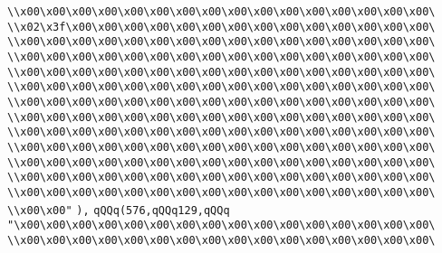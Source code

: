 \verb|\\x00\x00\x00\x00\x00\x00\x00\x00\x00\x00\x00\x00\x00\x00\x00\x00\|\newline
\verb|\\x02\x3f\x00\x00\x00\x00\x00\x00\x00\x00\x00\x00\x00\x00\x00\x00\|\newline
\verb|\\x00\x00\x00\x00\x00\x00\x00\x00\x00\x00\x00\x00\x00\x00\x00\x00\|\newline
\verb|\\x00\x00\x00\x00\x00\x00\x00\x00\x00\x00\x00\x00\x00\x00\x00\x00\|\newline
\verb|\\x00\x00\x00\x00\x00\x00\x00\x00\x00\x00\x00\x00\x00\x00\x00\x00\|\newline
\verb|\\x00\x00\x00\x00\x00\x00\x00\x00\x00\x00\x00\x00\x00\x00\x00\x00\|\newline
\verb|\\x00\x00\x00\x00\x00\x00\x00\x00\x00\x00\x00\x00\x00\x00\x00\x00\|\newline
\verb|\\x00\x00\x00\x00\x00\x00\x00\x00\x00\x00\x00\x00\x00\x00\x00\x00\|\newline
\verb|\\x00\x00\x00\x00\x00\x00\x00\x00\x00\x00\x00\x00\x00\x00\x00\x00\|\newline
\verb|\\x00\x00\x00\x00\x00\x00\x00\x00\x00\x00\x00\x00\x00\x00\x00\x00\|\newline
\verb|\\x00\x00\x00\x00\x00\x00\x00\x00\x00\x00\x00\x00\x00\x00\x00\x00\|\newline
\verb|\\x00\x00\x00\x00\x00\x00\x00\x00\x00\x00\x00\x00\x00\x00\x00\x00\|\newline
\verb|\\x00\x00\x00\x00\x00\x00\x00\x00\x00\x00\x00\x00\x00\x00\x00\x00\|\newline
\verb|\\x00\x00"|\newline
\verb|),|\newline
\verb|qQQq(576,qQQq129,qQQq|\newline
\verb|"\x00\x00\x00\x00\x00\x00\x00\x00\x00\x00\x00\x00\x00\x00\x00\x00\|\newline
\verb|\\x00\x00\x00\x00\x00\x00\x00\x00\x00\x00\x00\x00\x00\x00\x00\x00\|\newline
